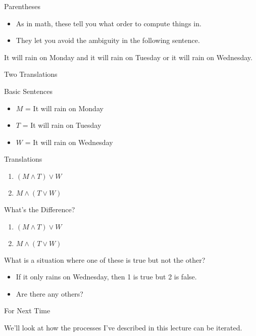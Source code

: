 \documentclass[
  ignorenonframetext,
]{beamer}
\providecommand{\tightlist}{%
  \setlength{\itemsep}{0pt}\setlength{\parskip}{0pt}}
\renewcommand{\,}{\text{, }}
\renewenvironment*{quote}	
	{\list{}{\rightmargin   \leftmargin} \item } 	
	{\endlist }
\begin{document}
\begin{frame}{Parentheses}
\protect\hypertarget{parentheses}{}

\begin{itemize}
\tightlist
\item
  As in math, these tell you what order to compute things in.
\item
  They let you avoid the ambiguity in the following sentence.
\end{itemize}

\begin{quote}
It will rain on Monday and it will rain on Tuesday or it will rain on
Wednesday.
\end{quote}

\end{frame}

\begin{frame}{Two Translations}
\protect\hypertarget{two-translations}{}

Basic Sentences

\begin{itemize}
\tightlist
\item
  \(M\) = It will rain on Monday
\item
  \(T\) = It will rain on Tuesday
\item
  \(W\) = It will rain on Wednesday
\end{itemize}

Translations

\begin{enumerate}
\tightlist
\item
  \((M \wedge T) \vee W\)
\item
  \(M \wedge (T \vee W)\)
\end{enumerate}

\end{frame}

\begin{frame}{What's the Difference?}
\protect\hypertarget{whats-the-difference}{}

\begin{enumerate}
\tightlist
\item
  \((M \wedge T) \vee W\)
\item
  \(M \wedge (T \vee W)\)
\end{enumerate}

What is a situation where one of these is true but not the other?

\begin{itemize}[<+->]
\tightlist
\item
  If it only rains on Wednesday, then 1 is true but 2 is false.
\item
  Are there any others?
\end{itemize}

\end{frame}

\begin{frame}{For Next Time}
\protect\hypertarget{for-next-time}{}

We'll look at how the processes I've described in this lecture can be
iterated.

\end{frame}
\end{document}
